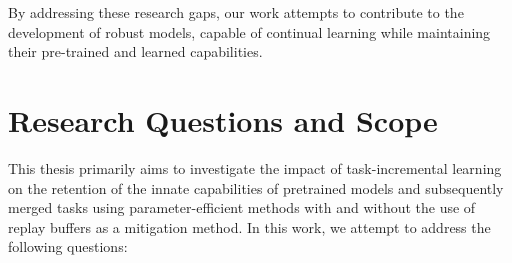 By addressing these research gaps, our work attempts to contribute to the development of robust models, capable of continual learning while maintaining their pre-trained and learned capabilities.

\section{Research Questions and Scope} \label{ResearchQuestions}
This thesis primarily aims to investigate the impact of task-incremental learning on the retention of the innate capabilities of pretrained models and subsequently merged tasks using parameter-efficient methods with and without the use of replay buffers as a mitigation method. In this work, we attempt to address the following questions:
